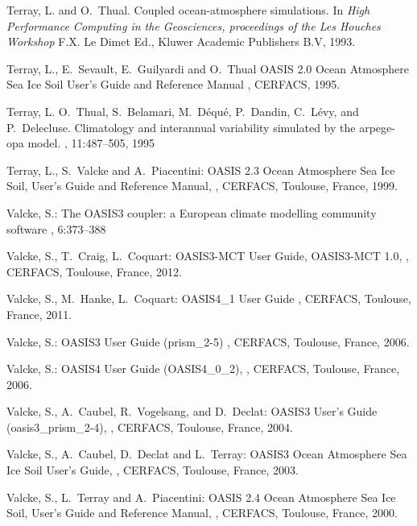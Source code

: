\begin{thebibliography}{10}
Terray, L. and O.~Thual.
\newblock Coupled ocean-atmosphere simulations. 
\newblock In {\em High Performance Computing in the Geosciences,
proceedings of the Les Houches Workshop}
\newblock F.X. Le Dimet Ed., Kluwer Academic Publishers B.V, 1993.

Terray, L., E.~Sevault, E.~Guilyardi and O.~Thual
\newblock OASIS 2.0 Ocean Atmosphere Sea Ice Soil User's Guide and Reference Manual
, CERFACS, 1995.

Terray, L. O.~Thual, S.~Belamari, M.~D\'equ\'e, P.~Dandin, C.~L\'evy, and
P.~Delecluse. 
\newblock Climatology and interannual variability simulated by the arpege-opa
model. 
, 11:487--505, 1995

Terray, L., S.~Valcke and A.~Piacentini:
\newblock OASIS 2.3 Ocean Atmosphere Sea Ice Soil, User's Guide and
Reference Manual,
, 
\newblock CERFACS, Toulouse, France, 1999.

Valcke, S.: 
\newblock The OASIS3 coupler: a European climate modelling community software
, 6:373--388

Valcke, S., T.~Craig, L.~Coquart: 
\newblock OASIS3-MCT User Guide, OASIS3-MCT 1.0, 
,  
\newblock CERFACS, Toulouse, France, 2012.

Valcke, S., M.~Hanke, L.~Coquart:
\newblock OASIS4\_1 User Guide
, 
\newblock CERFACS, Toulouse, France, 2011. 

Valcke, S.: 
\newblock OASIS3 User Guide (prism\_2-5) 
, 
\newblock CERFACS, Toulouse, France, 2006. 

Valcke, S.: 
\newblock OASIS4 User Guide (OASIS4\_0\_2), 
, 
\newblock CERFACS, Toulouse, France, 2006. 

Valcke, S., A.~Caubel, R.~Vogelsang, and D.~Declat:       
\newblock OASIS3 User's Guide (oasis3\_prism\_2-4),
, 
\newblock CERFACS, Toulouse, France, 2004.

Valcke, S., A.~Caubel, D.~Declat and L.~Terray:        
\newblock OASIS3 Ocean Atmosphere Sea Ice Soil User's Guide,
, 
\newblock CERFACS, Toulouse, France, 2003.

Valcke, S., L.~Terray and A.~Piacentini:
\newblock OASIS 2.4 Ocean Atmosphere Sea Ice Soil, User's Guide and
Reference Manual,
, 
\newblock CERFACS, Toulouse, France, 2000.

\end{thebibliography}
